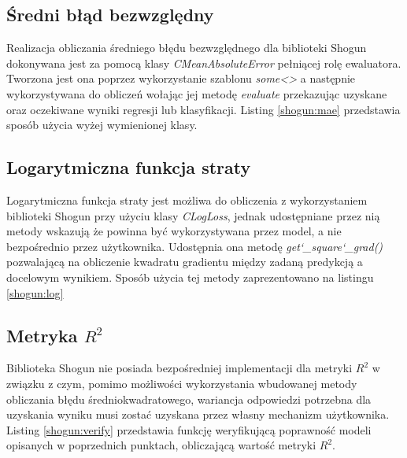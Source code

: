 
\subsection{Średni błąd bezwzględny}

Realizacja obliczania średniego błędu bezwzględnego dla biblioteki Shogun dokonywana jest za pomocą klasy \textit{CMeanAbsoluteError} pełniącej rolę ewaluatora. Tworzona jest ona poprzez wykorzystanie szablonu \textit{some<>} a następnie wykorzystywana do obliczeń wołając jej metodę \textit{evaluate} przekazując uzyskane oraz oczekiwane wyniki regresji lub klasyfikacji. Listing \ref{shogun:mae} przedstawia sposób użycia wyżej wymienionej klasy.


\subsection{Logarytmiczna funkcja straty}

Logarytmiczna funkcja straty jest możliwa do obliczenia z wykorzystaniem biblioteki Shogun przy użyciu klasy \textit{CLogLoss}, jednak udostępniane przez nią metody wskazują że powinna być wykorzystywana przez model, a nie bezpośrednio przez użytkownika. Udostępnia ona metodę \textit{get\char`_square\char`_grad()} pozwalającą na obliczenie kwadratu gradientu między zadaną predykcją a docelowym wynikiem. Sposób użycia tej metody zaprezentowano na listingu \ref{shogun:log}


\subsection{Metryka $R^2$}

Biblioteka Shogun nie posiada bezpośredniej implementacji dla metryki $R^2$ w związku z czym, pomimo możliwości wykorzystania wbudowanej metody obliczania błędu średniokwadratowego, wariancja odpowiedzi potrzebna dla uzyskania wyniku musi zostać uzyskana przez własny mechanizm użytkownika. Listing \ref{shogun:verify} przedstawia funkcję weryfikującą poprawność modeli opisanych w poprzednich punktach, obliczającą wartość metryki $R^2$.


